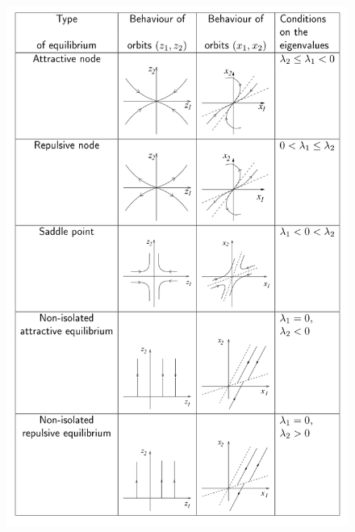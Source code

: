 \documentclass[12pt, openany]{report}
\theoremstyle{definition}
\begin{document}
\begin{figure}[H]
    \centering
    \includegraphics[width = \textwidth]{img/orbit_lin_sys_1.png}
\end{figure}
\end{document}
